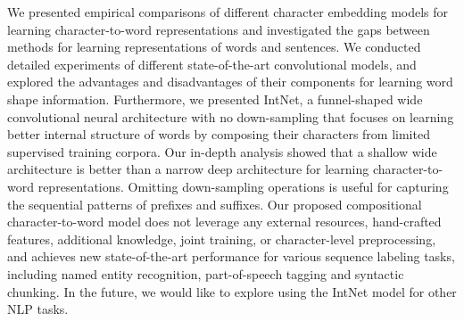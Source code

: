 \documentclass[11pt,a4paper]{article}
\begin{document}
We presented empirical comparisons of different character embedding models for learning character-to-word representations and investigated the gaps between methods for learning representations of words and sentences. We conducted detailed experiments of different state-of-the-art convolutional models, and explored the advantages and disadvantages of their components for learning word shape information. Furthermore, we presented IntNet, a funnel-shaped wide convolutional neural architecture with no down-sampling that focuses on learning better internal structure of words by composing their characters from limited supervised training corpora. Our in-depth analysis showed that a shallow wide architecture is better than a narrow deep architecture for learning character-to-word representations. Omitting down-sampling operations is useful for capturing the sequential patterns of prefixes and suffixes. Our proposed compositional character-to-word model does not leverage any external resources, hand-crafted features, additional knowledge, joint training, or character-level preprocessing, and achieves new state-of-the-art performance for various sequence labeling tasks, including named entity recognition, part-of-speech tagging and syntactic chunking. In the future, we would like to explore using the IntNet model for other NLP tasks.
 



\end{document}
